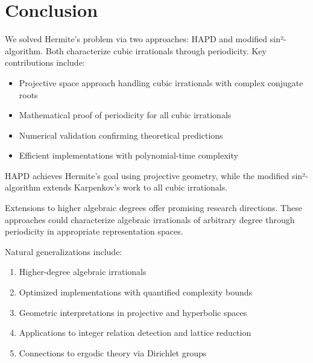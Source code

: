 \section{Conclusion}\label{sec:conclusion}

We solved Hermite's problem via two approaches: HAPD and modified sin²-algorithm. Both characterize cubic irrationals through periodicity. Key contributions include:

\begin{itemize}
\item Projective space approach handling cubic irrationals with complex conjugate roots
\item Mathematical proof of periodicity for all cubic irrationals
\item Numerical validation confirming theoretical predictions
\item Efficient implementations with polynomial-time complexity
\end{itemize}

HAPD achieves Hermite's goal using projective geometry, while the modified sin²-algorithm extends Karpenkov's work to all cubic irrationals.

Extensions to higher algebraic degrees offer promising research directions. These approaches could characterize algebraic irrationals of arbitrary degree through periodicity in appropriate representation spaces.

Natural generalizations include:
\begin{enumerate}
\item Higher-degree algebraic irrationals
\item Optimized implementations with quantified complexity bounds
\item Geometric interpretations in projective and hyperbolic spaces
\item Applications to integer relation detection and lattice reduction
\item Connections to ergodic theory via Dirichlet groups
\end{enumerate}
